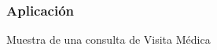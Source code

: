 \documentclass[14pt]{beamer}
\begin{document}
\begin{frame}
\frametitle{Aplicación}
Muestra de una consulta de Visita Médica
\begin{columns}
\begin{column}{0.3\textwidth}
\begin{center}

\begin{small}
\caption{}
\end{small}
\end{center}
\end{column}


\end{columns}

\end{frame}
\end{document}
